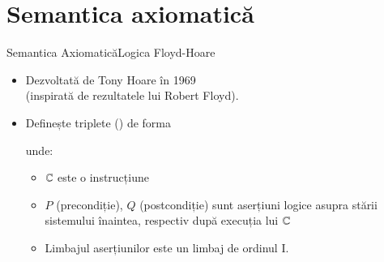 \documentclass[xcolor=pdftex,romanian,colorlinks]{beamer}
\begin{document}
\section{\color{section-color}Semantica axiomatică} 

\begin{frame}{Semantica Axiomatică}{Logica Floyd-Hoare}
\begin{itemize}

\item Dezvoltată de Tony Hoare în 1969 \\(inspirată de rezultatele lui Robert Floyd).

\medskip
\item   Definește triplete () de forma
 \begin{center}
 \end{center}
 unde:
  \begin{itemize}
    \item $\mathbb{C}$ este o instrucțiune 
    
    \medskip
    \item $P$ (precondiție), $Q$ (postcondiție) sunt aserțiuni logice asupra stării sistemului înaintea, respectiv după execuția lui $\mathbb{C}$
    
    \medskip
    \item Limbajul aserțiunilor este un limbaj de ordinul I.
 \medskip
 \end{itemize}
  \end{itemize}
  
 
  \end{frame}
\end{document}
